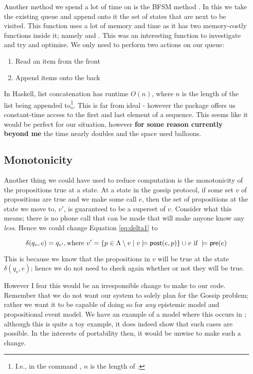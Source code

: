 \documentclass[10pt, a4paper]{report}
\begin{document}
Another method we spend a lot of time on is the BFSM method . In
this we take the existing queue and append onto it the set of states that are
next to be visited. This function uses a lot of memory and time as it has two
memory-costly functions inside it; namely  and \mih{(++)}.
This was an interesting function to investigate and try and optimise. We only
need to perform two actions on our queue:

\begin{enumerate}
\item Read an item from the front
\item Append items onto the back
\end{enumerate}

In Haskell, list concatenation has runtime $O(n)$, where $n$ is the length of
the list being appended to\footnote{I.e., in the command , $n$
  is the length of .}. This is far from ideal - however the
 package offers us constant-time access to the first and last
element of a sequence. This seems like it would be perfect for our situation,
however \textbf{for some reason currently beyond me} the time nearly doubles and
the space used balloons.

\subsection{Monotonicity}

Another thing we could have used to reduce computation is the monotonicity of
the propositions true at a state. At a state in the gossip protocol, if some set
$v$ of propositions are true and we make some call $e$, then the set of
propositions at the state we move to, $v'$, is guaranteed to be a superset of
$v$. Consider what this means; there is no phone call that can be made that will
make anyone know any \emph{less}. Hence we could change Equation
\ref{eq:delta1} to

\begin{equation} \label{eq:delta2}
  \delta(q_v, e) = q_{v'}, \text{where } v' = \{p \in \Lambda \setminus v \mid v \models \textsf{post}(e, p)\} \cup v
  \text{ if } 
  \models \textsf{pre}(e)
\end{equation}

This is because we know that the propositions in $v$ will be true at the state
$\delta(q_v, e)$; hence we do not need to check again whether or not they will
be true. 

However I fear this would be an irresponsible change to make to our code.
Remember that we do not want our system to solely plan for the Gossip problem;
rather we want it to be capable of doing so for \emph{any} epistemic model and
propositional event model. We have an example of a model where this occurs in
; although this is quite a toy example, it does indeed show
that such cases are possible. In the interests of portability then, it would be
unwise to make such a change. 
\end{document}
